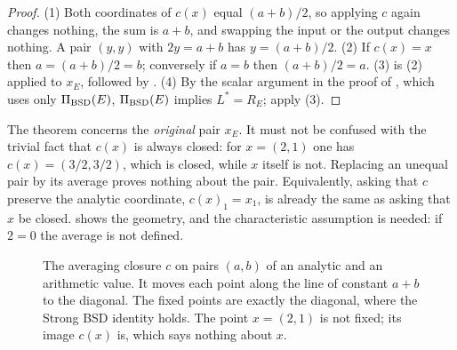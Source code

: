 \documentclass[11pt]{article}
\theoremstyle{definition}
\begin{document}
\begin{proof}
(1) Both coordinates of $c(x)$ equal $(a+b)/2$, so applying $c$ again
changes nothing, the sum is $a+b$, and swapping the input or the output
changes nothing.  A pair $(y,y)$ with $2y=a+b$ has $y=(a+b)/2$.
(2) If $c(x)=x$ then $a=(a+b)/2=b$; conversely if $a=b$ then
$(a+b)/2=a$.  (3) is (2) applied to $x_E$, followed by
.  (4) By the scalar argument in the proof of
, which uses only $\Pi_{\mathrm{BSD}}(E)$,
$\Pi_{\mathrm{BSD}}(E)$ implies $L^*=R_E$; apply (3).
\end{proof}

The theorem concerns the \emph{original} pair $x_E$.  It must not be
confused with the trivial fact that $c(x)$ is always closed: for
$x=(2,1)$ one has $c(x)=(3/2,3/2)$, which is closed, while $x$ itself is
not.  Replacing an unequal pair by its average proves nothing about the
pair.  Equivalently, asking that $c$ preserve the analytic coordinate,
$c(x)_1=x_1$, is already the same as asking that $x$ be closed.
 shows the geometry, and the
characteristic assumption is needed: if $2=0$ the average is not
defined.

\begin{figure}[tbp]
\centering
{}
\caption{The averaging closure \(c\) on pairs \((a,b)\) of an analytic
and an arithmetic value.  It moves each point along the line of constant
\(a+b\) to the diagonal.  The fixed points are exactly the diagonal, where
the Strong BSD identity holds.  The point \(x=(2,1)\) is not fixed; its
image \(c(x)\) is, which says nothing about \(x\).}
\label{fig:averaging-closure}
\end{figure}
 
\end{document}
